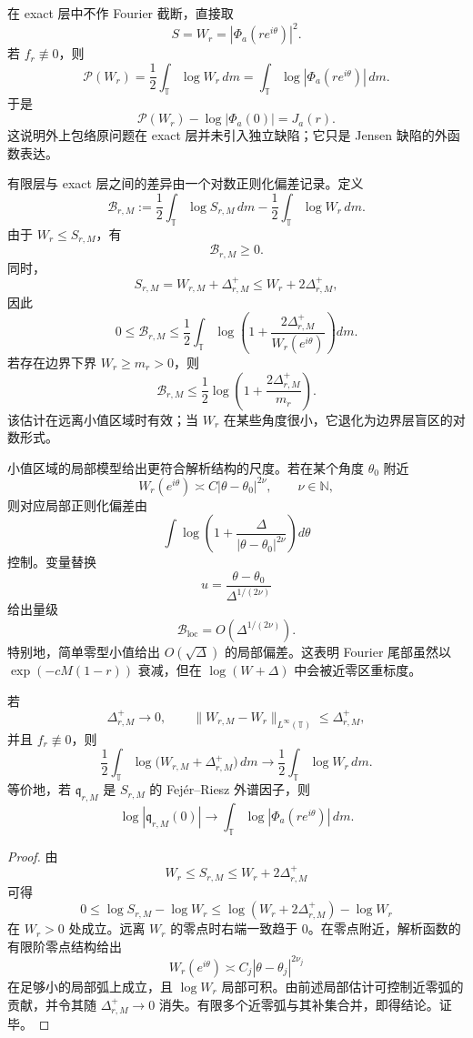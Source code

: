 在 exact 层中不作 Fourier 截断，直接取
\[
S=W_r=|\Phi_a(re^{i\theta})|^2.
\]
若 \(f_r\not\equiv0\)，则
\[
\mathcal P(W_r)
=
\frac12\int_{\mathbb T}\log W_r\,dm
=
\int_{\mathbb T}\log|\Phi_a(re^{i\theta})|\,dm.
\]
于是
\[
\mathcal P(W_r)-\log|\Phi_a(0)|
=
J_a(r).
\]
这说明外上包络原问题在 exact 层并未引入独立缺陷；它只是 Jensen 缺陷的外函数表达。

有限层与 exact 层之间的差异由一个对数正则化偏差记录。定义
\[
\mathcal B_{r,M}
:=
\frac12\int_{\mathbb T}\log S_{r,M}\,dm
-
\frac12\int_{\mathbb T}\log W_r\,dm.
\]
由于 \(W_r\le S_{r,M}\)，有
\[
\mathcal B_{r,M}\ge0.
\]
同时，
\[
S_{r,M}
=
W_{r,M}+\Delta_{r,M}^+
\le
W_r+2\Delta_{r,M}^+,
\]
因此
\[
0\le
\mathcal B_{r,M}
\le
\frac12
\int_{\mathbb T}
\log\left(
1+\frac{2\Delta_{r,M}^+}{W_r(e^{i\theta})}
\right)dm.
\]
若存在边界下界 \(W_r\ge m_r>0\)，则
\[
\mathcal B_{r,M}
\le
\frac12
\log\left(
1+\frac{2\Delta_{r,M}^+}{m_r}
\right).
\]
该估计在远离小值区域时有效；当 \(W_r\) 在某些角度很小，它退化为边界层盲区的对数形式。

小值区域的局部模型给出更符合解析结构的尺度。若在某个角度 \(\theta_0\) 附近
\[
W_r(e^{i\theta})
\asymp
C|\theta-\theta_0|^{2\nu},
\qquad
\nu\in\mathbb N,
\]
则对应局部正则化偏差由
\[
\int
\log\left(
1+\frac{\Delta}{|\theta-\theta_0|^{2\nu}}
\right)d\theta
\]
控制。变量替换
\[
u=\frac{\theta-\theta_0}{\Delta^{1/(2\nu)}}
\]
给出量级
\[
\mathcal B_{\mathrm{loc}}
=
O\!\left(\Delta^{1/(2\nu)}\right).
\]
特别地，简单零型小值给出 \(O(\sqrt{\Delta})\) 的局部偏差。这表明 Fourier 尾部虽然以 \(\exp(-cM(1-r))\) 衰减，但在 \(\log(W+\Delta)\) 中会被近零区重标度。

\begin{proposition}[谱因子正则化收敛]\label{prop:typed-address-biaxial-completion-spectral-factor-regularization-convergence}
若
\[
\Delta_{r,M}^+\to0,
\qquad
\|W_{r,M}-W_r\|_{L^\infty(\mathbb T)}\le\Delta_{r,M}^+,
\]
并且 \(f_r\not\equiv0\)，则
\[
\frac12\int_{\mathbb T}\log\bigl(W_{r,M}+\Delta_{r,M}^+\bigr)\,dm
\longrightarrow
\frac12\int_{\mathbb T}\log W_r\,dm.
\]
等价地，若 \(\mathfrak q_{r,M}\) 是 \(S_{r,M}\) 的 Fej\'er--Riesz 外谱因子，则
\[
\log|\mathfrak q_{r,M}(0)|
\longrightarrow
\int_{\mathbb T}\log|\Phi_a(re^{i\theta})|\,dm.
\]
\end{proposition}
\begin{proof}
由
\[
W_r\le S_{r,M}\le W_r+2\Delta_{r,M}^+
\]
可得
\[
0\le
\log S_{r,M}-\log W_r
\le
\log(W_r+2\Delta_{r,M}^+)-\log W_r
\]
在 \(W_r>0\) 处成立。远离 \(W_r\) 的零点时右端一致趋于 \(0\)。在零点附近，解析函数的有限阶零点结构给出
\[
W_r(e^{i\theta})\asymp C_j|\theta-\theta_j|^{2\nu_j}
\]
在足够小的局部弧上成立，且 \(\log W_r\) 局部可积。由前述局部估计可控制近零弧的贡献，并令其随 \(\Delta_{r,M}^+\to0\) 消失。有限多个近零弧与其补集合并，即得结论。证毕。
\end{proof}

